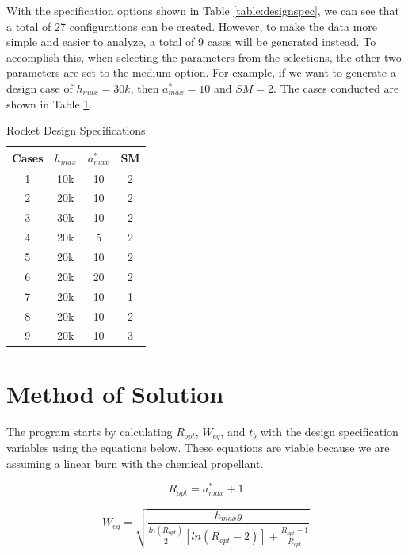 \documentclass{report}
\begin{document}
\noindent With the specification options shown in Table \ref{table:designspec}, we can see that a total of 27 configurations can be created.
However, to make the data more simple and easier to analyze, a total of 9 cases will be generated instead. 
To accomplish this, when selecting the parameters from the selections, the other two parameters are set to the medium option.
For example, if we want to generate a design case of $h_{max} = 30k$, then $a^*_{max} = 10$ and $SM = 2$.
The cases conducted are shown in Table \ref{table:designcase}.\\

\begin{table}[h!]
    \centering
    \caption{Rocket Design Specifications}
    \begin{tabular}{|c|c|c|c|}
        \hline
        \textbf{Cases} & \textbf{$h_{max}$} & \textbf{$a^*_{max}$} & \textbf{SM}\\
        \hline
        1 & 10k & 10 & 2 \\[4pt]
        2 & 20k & 10 & 2 \\[4pt]
        3 & 30k & 10 & 2 \\[4pt]
        \hline
        4 & 20k & 5 & 2 \\[4pt]
        5 & 20k & 10 & 2 \\[4pt]
        6 & 20k & 20 & 2 \\[4pt]
        \hline
        7 & 20k & 10 & 1 \\[4pt]
        8 & 20k & 10 & 2 \\[4pt]
        9 & 20k & 10 & 3 \\[4pt]
        \hline
    \end{tabular}
    \label{table:designcase}
\end{table}

\newpage
\section*{Method of Solution}

The program starts by calculating $R_{opt}$, $W_{eq}$, and $t_b$ with the design specification variables using the equations below.
These equations are viable because we are assuming a linear burn with the chemical propellant.

\begin{equation}
    R_{opt} = a^*_{max} + 1
\end{equation}

\begin{equation}
    W_{eq} = \sqrt{\frac{h_{max}g}{\frac{ln(R_{opt})}{2}[ln(R_{opt}-2)]+\frac{R_{opt}-1}{R_{opt}}}}
\end{equation}
\end{document}
